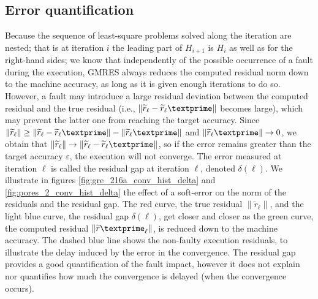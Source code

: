 \documentclass[twoside]{article}
\newcounter{fig}\setcounter{fig}{0}
\begin{document}
  \subsection{Error quantification}\label{sec:quantify}
  Because the sequence of least-square problems solved along the iteration are nested; that is at iteration $i$ 
  the leading part of $H_{i+1}$ is $H_i$ as well as for the right-hand sides; we know that independently of the possible occurrence of a fault during the execution, GMRES always reduces the computed residual norm down to the machine accuracy, as long as it is given enough iterations to do so. However, a fault may introduce a large residual deviation between the computed residual and the true residual (i.e., $\|\widetilde{r}_{\ell} - \widetilde{r}_{\ell}\textprime \|$ becomes large), which may prevent the latter one from reaching the target accuracy. Since $ \|\widetilde{r}_{\ell}\| \geq \|\widetilde{r}_{\ell} - \widetilde{r}_{\ell}\textprime \| - \| \widetilde{r}_{\ell}\textprime \|$ and $\|\widetilde{r}_\ell\textprime \| \rightarrow 0$, we obtain that $\|\widetilde{r}_{\ell}\| \rightarrow \|\widetilde{r}_{\ell} - \widetilde{r}_\ell\textprime \|$, so if the error remains greater than the target accuracy $\varepsilon$, the execution will not converge. The error measured at iteration $\ell$ is called the residual gap at iteration $\ell$, denoted $\delta(\ell)$.
  We illustrate in figures \ref{fig:gre_216a_conv_hist_delta} and \ref{fig:pores_2_conv_hist_delta} the effect of a soft-error on the norm of the residuals and the residual gap.
  The red curve, the true residual $\|\widetilde{r}_{\ell}\|$, and the light blue curve, the residual gap $\delta(\ell)$, get closer and closer as the green curve, the computed residual $\|\widetilde{r}\textprime_{\ell}\|$, is reduced down to the machine accuracy.
  The dashed blue line shows the non-faulty execution residuals, to illustrate the delay induced by the error in the convergence.
  The residual gap provides a good quantification of the fault impact, however it does not explain nor quantifies how much the convergence is delayed (when the convergence occurs).
\end{document}
